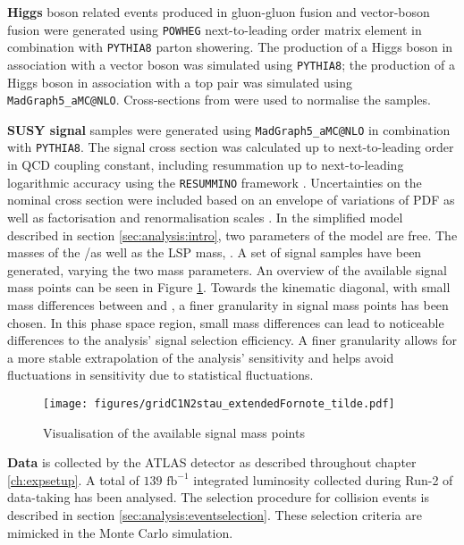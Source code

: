 \textbf{Higgs} boson related events produced in gluon-gluon fusion and vector-boson fusion were generated using \texttt{POWHEG} next-to-leading order matrix element in combination with \texttt{PYTHIA8} parton showering.  The production of a Higgs boson in association with a vector boson was simulated using \texttt{PYTHIA8}; the production of a Higgs boson in association with a top pair was simulated using \texttt{MadGraph5\_aMC@NLO}.  Cross-sections from \cite{CERNYellowReportHiggs} were used to normalise the samples.

\textbf{SUSY signal} samples were generated using \texttt{MadGraph5\_aMC@NLO} in combination with \texttt{PYTHIA8}. 
The signal cross section was calculated up to next-to-leading order in QCD coupling constant,  including resummation up to next-to-leading logarithmic accuracy using the \texttt{RESUMMINO} framework \cite{XSecOrig,Resummino}.  Uncertainties on the nominal cross section were included based on an envelope of variations of PDF as well as factorisation and renormalisation scales \cite{SigXSecVariation}.   %
In the simplified model described in section \ref{sec:analysis:intro},  two parameters of the model are free.  The masses of the \Cone/\Ntwo as well as the \ac{LSP} mass,  \None. 
A set of signal samples have been generated, varying the two mass parameters.  An overview of the available signal mass points can be seen in Figure \ref{fig:analysis:grid}.
Towards the kinematic diagonal,  with small mass differences between \Cone and \None, a finer granularity in signal mass points has been chosen.  In this phase space region,  small mass differences can lead to noticeable differences to the analysis' signal selection efficiency. A finer granularity allows for a more stable extrapolation of the analysis' sensitivity and helps avoid fluctuations in sensitivity due to statistical fluctuations. 
\FloatBarrier
\begin{figure}[h]
\centering
\texttt{[image: figures/gridC1N2stau\_extendedFornote\_tilde.pdf]}
\caption{Visualisation of the available signal mass points \label{fig:analysis:grid}}
\end{figure}

\textbf{Data} is collected by the ATLAS detector as described throughout chapter \ref{ch:expsetup}.  A total of $139 \text{ fb}^{-1}$ integrated luminosity collected during Run-2 of data-taking has been analysed.  The selection procedure for collision events is described in section \ref{sec:analysis:eventselection}.  These selection criteria are mimicked in the Monte Carlo simulation. 

